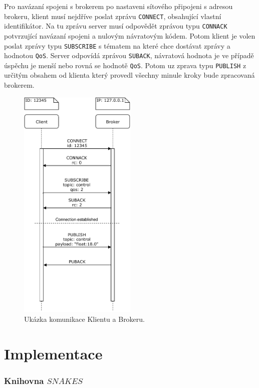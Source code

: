 Pro navázaní spojeni s brokerem po nastaveni sítového připojeni s adresou brokeru, klient musí nejdříve poslat zprávu \texttt{CONNECT}, obsahující vlastní identifikátor. Na tu zprávu server musí odpovědět zprávou typu \texttt{CONNACK} potvrzující navázaní spojeni a nulovým návratovým kódem. Potom klient je volen poslat zprávy typu \texttt{SUBSCRIBE} s tématem na které chce dostávat zprávy a hodnotou \texttt{QoS}. Server odpovídá zprávou \texttt{SUBACK}, návratová hodnota je ve případě úspěchu je menší nebo rovná se hodnotě \texttt{QoS}. Potom uz zprava typu \texttt{PUBLISH} z určitým obsahem od klienta který provedl všechny minule kroky bude zpracovaná brokerem.

\begin{figure}[hbt]
  \centering
  \includegraphics[width=0.5\textwidth]{obrazky-figures/MQTT-flow.pdf}
  \caption{Ukázka komunikace Klientu a Brokeru.}
  \label{mqtt-flow}
\end{figure}

\chapter{Implementace}
\label{sec:implementation}

\subsection{Knihovna $SNAKES$}

